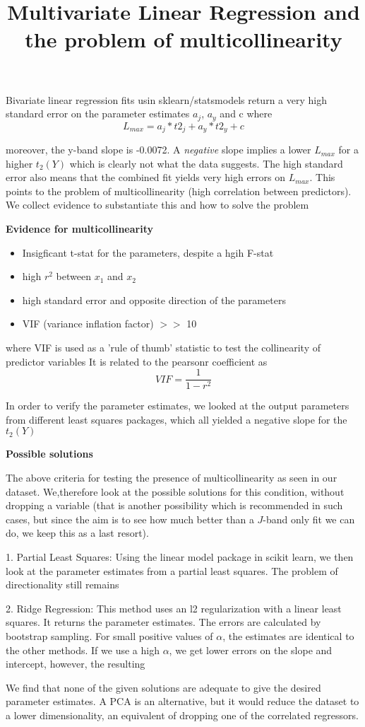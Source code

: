 \documentclass{article}
\title{Multivariate Linear Regression and the problem of multicollinearity}
\begin{document}
\maketitle
Bivariate linear regression fits usin sklearn/statsmodels return a very high standard error on the parameter estimates $a_j$, $a_y$ and c
where
\begin{equation}
L_{max}=a_j*t2_j+a_y*t2_y+c
\end{equation}

moreover, the y-band slope is -0.0072. A \emph{negative} slope implies a lower $L_{max}$ for a higher $t_2(Y)$ which is clearly not what the data suggests. The high standard error also means that the combined fit yields very high errors on $L_{max}$. This points to the problem of multicollinearity (high correlation between predictors). We collect evidence to substantiate this and how to solve the problem


{\bf Evidence for multicollinearity}

\begin{itemize}
\item	Insigficant t-stat for the parameters, despite a hgih F-stat
\item	high $r^2$ between $x_1$ and $x_2$
\item	high standard error and opposite direction of the parameters
\item	VIF (variance inflation factor) $>>$ 10
\end{itemize}
where VIF is used as a 'rule of thumb' statistic to test the collinearity of predictor variables
It is related to the pearsonr coefficient as 
\begin{equation}
VIF=\frac{1}{1-r^2}
\end{equation}

In order to verify the parameter estimates, we looked at the output parameters from different least squares packages, which all yielded a negative slope for the $t_2(Y)$


{\bf Possible solutions}

The above criteria for testing the presence of multicollinearity as seen in our dataset. We,therefore look at the possible solutions for this condition, without dropping a variable (that is another possibility which is recommended in such cases, but since the aim is to see how much better than a $J$-band only fit we can do, we keep this as a last resort).

1. Partial Least Squares: Using the linear model package in scikit learn, we then look at the parameter estimates from a partial least squares. The problem of directionality still remains 

2. Ridge Regression: This method uses an l2 regularization with a linear least squares. It returns the parameter estimates. The errors are calculated by bootstrap sampling. For small positive values of $\alpha$, the estimates are identical to the other methods. If we use a high $\alpha$, we get lower errors on the slope and intercept, however, the resulting 

We find that none of the given solutions are adequate to give the desired parameter estimates. A PCA is an alternative, but it would reduce the dataset to a lower dimensionality, an equivalent of dropping one of the correlated regressors.
\end{document}
